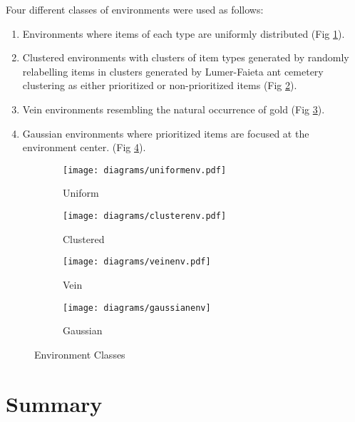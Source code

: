 Four different classes of environments were used as follows:
\begin{enumerate}
\item Environments where items of each type are uniformly distributed (Fig \ref{fig:uniformenv}).
\item Clustered environments with clusters of item types generated by randomly relabelling items in clusters generated by Lumer-Faieta ant cemetery clustering \cite{lumer1994diversity} as either prioritized or non-prioritized items (Fig \ref{fig:clusterenv}).
\item Vein environments resembling the natural occurrence of gold \cite{frimmel2002recent} (Fig \ref{fig:veinenv}).
\item Gaussian environments where prioritized items are focused at the environment center. (Fig \ref{fig:gaussianenv}). %
\end{enumerate} 

\vspace{-2em}
\begin{figure} [h]
        \centering
        \begin{subfigure}[b]{0.21\textwidth}
                \texttt{[image: diagrams/uniformenv.pdf]}
                \caption{Uniform}
                \label{fig:uniformenv}
        \end{subfigure}%
        \begin{subfigure}[b]{0.205\textwidth}
                \texttt{[image: diagrams/clusterenv.pdf]}
                \caption{Clustered}
                \label{fig:clusterenv}
        \end{subfigure}
        \begin{subfigure}[b]{0.2\textwidth}
                \texttt{[image: diagrams/veinenv.pdf]}
                \caption{Vein}
                \label{fig:veinenv}
        \end{subfigure}  
        \begin{subfigure}[b]{0.2\textwidth}
                        \texttt{[image: diagrams/gaussianenv]}
                        \caption{Gaussian}
                        \label{fig:gaussianenv}
       \end{subfigure}
        \caption{Environment Classes}\label{fig:environments}
\end{figure}


\section{Summary}
\label{fourth:summary}

